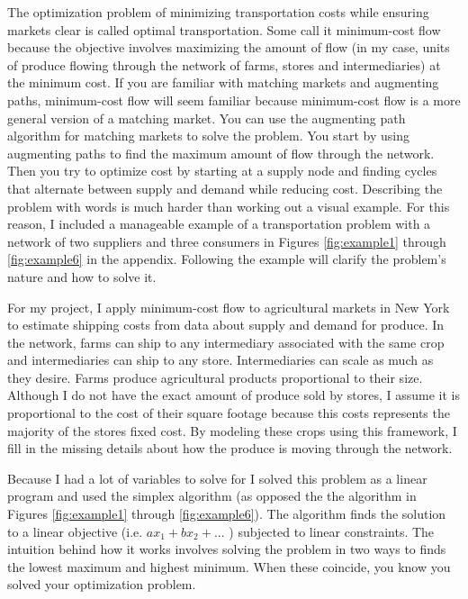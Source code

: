 \documentclass{report}
\begin{document}
The optimization problem of minimizing transportation costs while ensuring markets clear is called optimal transportation. Some call it minimum-cost flow because the objective involves maximizing the amount of flow (in my case, units of produce flowing through the network of farms, stores and intermediaries) at the minimum cost. If you are familiar with matching markets and augmenting paths, minimum-cost flow will seem familiar because minimum-cost flow is a more general version of a matching market. You can use the augmenting path algorithm for matching markets to solve the problem. You start by using augmenting paths to find the maximum amount of flow through the network. Then you try to optimize cost by starting at a supply node and finding cycles that alternate between supply and demand while reducing cost. Describing the problem with words is much harder than working out a visual example. For this reason, I included a manageable example of a transportation problem with a network of two suppliers and three consumers in Figures \ref{fig:example1} through \ref{fig:example6} in the appendix. Following the example will clarify the problem's nature and how to solve it.

For my project, I apply minimum-cost flow to agricultural markets in New York to estimate shipping costs from data about supply and demand for produce. In the network, farms can ship to any intermediary associated with the same crop and intermediaries can ship to any store. Intermediaries can scale as much as they desire. Farms produce agricultural products proportional to their size. Although I do not have the exact amount of produce sold by stores, I assume it is proportional to the cost of their square footage because this costs represents the majority of the stores fixed cost. By modeling these crops using this framework, I fill in the missing details about how the produce is moving through the network.

Because I had a lot of variables to solve for I solved this problem as a linear program and used the simplex algorithm (as opposed the the algorithm in Figures \ref{fig:example1} through \ref{fig:example6}). The algorithm finds the solution to a linear objective (i.e. $a x_1 +b x_2 + ...$ ) subjected to linear constraints. The intuition behind how it works involves solving the problem in two ways to finds the lowest maximum and highest minimum. When these coincide, you know you solved your optimization problem.
\end{document}
